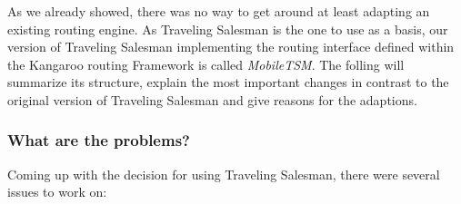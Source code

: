 As we already showed, there was no way to get around at least adapting an existing routing engine. As Traveling Salesman is the one to use as a basis, our version of Traveling Salesman implementing the routing interface defined within the Kangaroo routing Framework is called \emph{MobileTSM}. The folling will summarize its structure, explain the most important changes in contrast to the original version of Traveling Salesman and give reasons for the adaptions.

\subsubsection{What are the problems?}

Coming up with the decision for using Traveling Salesman, there were several issues to work on:

